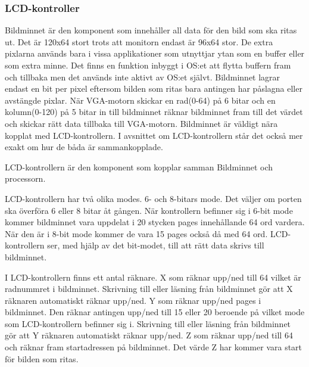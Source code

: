 \documentclass[main.tex]{subfiles}
\begin{document}
\subsubsection{LCD-kontroller}
Bildminnet är den komponent som innehåller all data för den bild som ska ritas
ut. Det är 120x64 stort trots att monitorn endast är 96x64 stor. De extra
pixlarna används bara i vissa applikationer som utnyttjar ytan som en buffer
eller som extra minne. Det finns en funktion inbyggt i OS:et att flytta buffern
fram och tillbaka men det används inte aktivt av OS:et självt. Bildminnet
lagrar endast en bit per pixel eftersom bilden som ritas bara antingen har
påslagna eller avstängde pixlar.  När VGA-motorn skickar en rad(0-64) på 6
bitar och en kolumn(0-120) på 5 bitar in till bildminnet räknar bildminnet fram
till det värdet och skickar rätt data tillbaka till VGA-motorn. Bildminnet är
väldigt nära kopplat med LCD-kontrollern. I avsnittet om LCD-kontrollern står
det också mer exakt om hur de båda är sammankopplade.

LCD-kontrollern är den komponent som kopplar samman Bildminnet och processorn.

LCD-kontrollern har två olika modes. 6- och 8-bitars mode. Det väljer om porten
ska överföra 6 eller 8 bitar åt gången. När kontrollern befinner sig i 6-bit
mode kommer bildminnet vara uppdelat i 20 stycken pages innehållande 64 ord
vardera. När den är i 8-bit mode kommer de vara 15 pages också då med 64 ord.
LCD-kontrollern ser, med hjälp av det bit-modet, till att rätt data skrivs till
bildminnet.

I LCD-kontrollern finns ett antal räknare.  X som räknar upp/ned till 64 vilket
är radnummret i bildminnet. Skrivning till eller läsning från bildminnet gör
att X räknaren automatiskt räknar upp/ned.  Y som räknar upp/ned pages i
bildminnet. Den räknar antingen upp/ned till 15 eller 20 beroende på vilket
mode som LCD-kontrollern befinner sig i. Skrivning till eller läsning från
bildminnet gör att Y räknaren automatiskt räknar upp/ned.  Z som räknar upp/ned
till 64 och räknar fram startadressen på bildminnet. Det värde Z har kommer
vara start för bilden som ritas.
\end{document}
